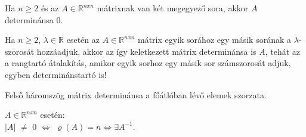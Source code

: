 	
	\begin{frame}
		\begin{tcolorbox}[title={Tétel.: Determináns két sor egyenlősége}]
			Ha $n \geq 2$ és az $A \in \mathbb{R}^{n x n}$  mátrixnak van két megegyező sora, akkor $A$ determinánsa $0$.
		\end{tcolorbox}	
		
		\begin{tcolorbox}[title={Tétel.: Determináns két sor összeadása}]
			Ha $n \geq 2$, $\lambda \in \mathbb{R}$ esetén az $A \in \mathbb{R}^{n x n}$ mátrix egyik sorához egy másik sorának a $\lambda $-szorosát hozzáadjuk, akkor az így keletkezett mátrix determinánsa is $A$, tehát az a rangtartó átalakítás, amikor egyik sorhoz egy másik sor számszorosát adjuk, egyben determinánstartó is!
		\end{tcolorbox}	
		
		\begin{tcolorbox}[title={Tétel.: Felsőháromszög mátrix}]
			Felső háromszög mátrix determinánsa a főátlóban lévő elemek szorzata.
		\end{tcolorbox}	
		
		\begin{tcolorbox}[title={Tétel.: Inverz létezése}]
			$A \in \mathbb{R}^{n x n}$ esetén:\\
			$|A|$ $\neq$ $0$ $\iff$ ${\varrho}(A) = n \iff {\exists}A^{-1}$.
		\end{tcolorbox}	
	\end{frame}
	

